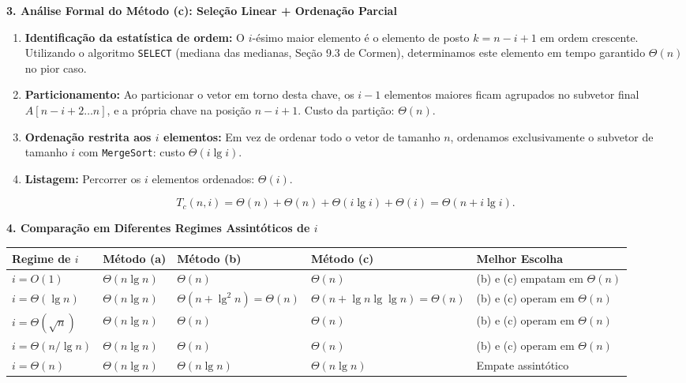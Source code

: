 \documentclass[11pt,a4paper]{article}
\newcommand{\topico}[1]{\par\medskip\textbf{\color{azul}#1}\par}
\begin{document}
\topico{3. Análise Formal do Método (c): Seleção Linear + Ordenação Parcial}
\begin{enumerate}
    \item \textbf{Identificação da estatística de ordem:} O $i$-ésimo maior elemento é o elemento de posto $k = n - i + 1$ em ordem crescente. Utilizando o algoritmo \texttt{SELECT} (mediana das medianas, Seção 9.3 de Cormen), determinamos este elemento em tempo garantido $\Theta(n)$ no pior caso.
    \item \textbf{Particionamento:} Ao particionar o vetor em torno desta chave, os $i - 1$ elementos maiores ficam agrupados no subvetor final $A[n - i + 2 \dots n]$, e a própria chave na posição $n - i + 1$. Custo da partição: $\Theta(n)$.
    \item \textbf{Ordenação restrita aos $i$ elementos:} Em vez de ordenar todo o vetor de tamanho $n$, ordenamos exclusivamente o subvetor de tamanho $i$ com \texttt{MergeSort}: custo $\Theta(i \lg i)$.
    \item \textbf{Listagem:} Percorrer os $i$ elementos ordenados: $\Theta(i)$.
\end{enumerate}
\[
T_c(n, i) = \Theta(n) + \Theta(n) + \Theta(i \lg i) + \Theta(i) = \Theta(n + i \lg i).
\]

\topico{4. Comparação em Diferentes Regimes Assintóticos de $i$}
\begin{center}
\footnotesize
\setlength{\tabcolsep}{3.5pt}
\begin{tabular}{p{2.3cm}p{2.2cm}p{3.2cm}p{3.5cm}p{3.4cm}}
\toprule
\textbf{Regime de $i$} & \textbf{Método (a)} & \textbf{Método (b)} & \textbf{Método (c)} & \textbf{Melhor Escolha} \\ \midrule
$i = O(1)$ & $\Theta(n \lg n)$ & $\Theta(n)$ & $\Theta(n)$ & (b) e (c) empatam em $\Theta(n)$ \\
$i = \Theta(\lg n)$ & $\Theta(n \lg n)$ & $\Theta(n + \lg^2 n) = \Theta(n)$ & $\Theta(n + \lg n \lg \lg n) = \Theta(n)$ & (b) e (c) operam em $\Theta(n)$ \\
$i = \Theta(\sqrt{n})$ & $\Theta(n \lg n)$ & $\Theta(n)$ & $\Theta(n)$ & (b) e (c) operam em $\Theta(n)$ \\
$i = \Theta(n / \lg n)$ & $\Theta(n \lg n)$ & $\Theta(n)$ & $\Theta(n)$ & (b) e (c) operam em $\Theta(n)$ \\
$i = \Theta(n)$ & $\Theta(n \lg n)$ & $\Theta(n \lg n)$ & $\Theta(n \lg n)$ & Empate assintótico \\
\bottomrule
\end{tabular}
\end{center}
\end{document}
